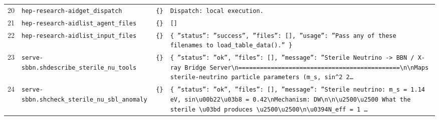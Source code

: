 \documentclass[11pt,a4paper]{article}
\begin{document}
\begin{longtable}{@{}p{}p{}p{}p{}@{}}
20 & \texttt{hep-research-aid}\newline\texttt{get\_\allowbreak{}dispatch} & \texttt{\{\}\allowbreak{}} & \texttt{Dispatch:\allowbreak{} local execution.} \\
21 & \texttt{hep-research-aid}\newline\texttt{list\_\allowbreak{}agent\_\allowbreak{}files} & \texttt{\{\}\allowbreak{}} & \texttt{[]\allowbreak{}} \\
22 & \texttt{hep-research-aid}\newline\texttt{list\_\allowbreak{}input\_\allowbreak{}files} & \texttt{\{\}\allowbreak{}} & \texttt{\{   ''status'':\allowbreak{} ''success'',\allowbreak{}   ''files'':\allowbreak{} []\allowbreak{},\allowbreak{}   ''usage'':\allowbreak{} ''Pass any of these filenames to load\_\allowbreak{}table\_\allowbreak{}data()\allowbreak{}.'' \}\allowbreak{}} \\
23 & \texttt{serve-sbbn.sh}\newline\texttt{describe\_\allowbreak{}sterile\_\allowbreak{}nu\_\allowbreak{}tools} & \texttt{\{\}\allowbreak{}} & \texttt{\{   ''status'':\allowbreak{} ''ok'',\allowbreak{}   ''files'':\allowbreak{} []\allowbreak{},\allowbreak{}   ''message'':\allowbreak{} ''Sterile Neutrino -\textgreater{}\allowbreak{} BBN /\allowbreak{} X-ray Bridge Server\textbackslash{}\allowbreak{}n=\allowbreak{}=\allowbreak{}=\allowbreak{}=\allowbreak{}=\allowbreak{}=\allowbreak{}=\allowbreak{}=\allowbreak{}=\allowbreak{}=\allowbreak{}=\allowbreak{}=\allowbreak{}=\allowbreak{}=\allowbreak{}=\allowbreak{}=\allowbreak{}=\allowbreak{}=\allowbreak{}=\allowbreak{}=\allowbreak{}=\allowbreak{}=\allowbreak{}=\allowbreak{}=\allowbreak{}=\allowbreak{}=\allowbreak{}=\allowbreak{}=\allowbreak{}=\allowbreak{}=\allowbreak{}=\allowbreak{}=\allowbreak{}=\allowbreak{}=\allowbreak{}=\allowbreak{}=\allowbreak{}=\allowbreak{}=\allowbreak{}=\allowbreak{}=\allowbreak{}=\allowbreak{}=\allowbreak{}=\allowbreak{}=\allowbreak{}=\allowbreak{}\textbackslash{}\allowbreak{}n\textbackslash{}\allowbreak{}nMaps sterile-neutrino particle parameters (m\_\allowbreak{}s,\allowbreak{} sin\textasciicircum{}\allowbreak{}2 2\ldots{}\allowbreak{}} \\
24 & \texttt{serve-sbbn.sh}\newline\texttt{check\_\allowbreak{}sterile\_\allowbreak{}nu\_\allowbreak{}sbl\_\allowbreak{}anomaly} & \texttt{\{\}\allowbreak{}} & \texttt{\{   ''status'':\allowbreak{} ''ok'',\allowbreak{}   ''files'':\allowbreak{} []\allowbreak{},\allowbreak{}   ''message'':\allowbreak{} ''Sterile neutrino:\allowbreak{} m\_\allowbreak{}s =\allowbreak{} 1.14 eV,\allowbreak{} sin\textbackslash{}\allowbreak{}u00b22\textbackslash{}\allowbreak{}u03b8 =\allowbreak{} 0.42\textbackslash{}\allowbreak{}nMechanism:\allowbreak{} DW\textbackslash{}\allowbreak{}n\textbackslash{}\allowbreak{}n\textbackslash{}\allowbreak{}u2500\textbackslash{}\allowbreak{}u2500 What the sterile \textbackslash{}\allowbreak{}u03bd produces \textbackslash{}\allowbreak{}u2500\textbackslash{}\allowbreak{}u2500\textbackslash{}\allowbreak{}n\textbackslash{}\allowbreak{}u0394N\_\allowbreak{}eff =\allowbreak{} 1 \ldots{}\allowbreak{}} \\

\end{longtable}
\end{document}
